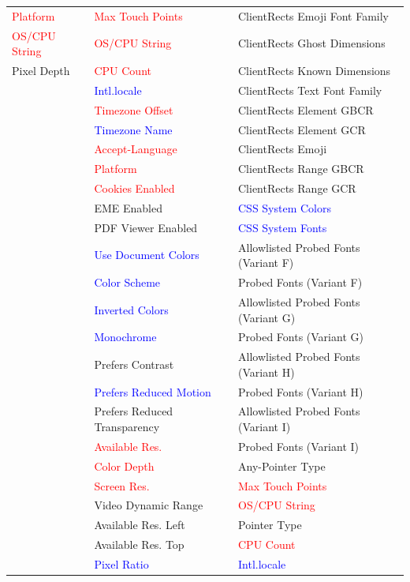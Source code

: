 {\begin{longtable}{l | l | l}
\textcolor{red}{Platform} & \textcolor{red}{Max Touch Points} & ClientRects Emoji Font Family \\
\textcolor{red}{OS/CPU String} & \textcolor{red}{OS/CPU String} & ClientRects Ghost Dimensions \\
Pixel Depth & \textcolor{red}{CPU Count} & ClientRects Known Dimensions \\
 & \textcolor{blue}{Intl.locale} & ClientRects Text Font Family \\
 & \textcolor{red}{Timezone Offset} & ClientRects Element GBCR \\
 & \textcolor{blue}{Timezone Name} & ClientRects Element GCR \\
 & \textcolor{red}{Accept-Language} & ClientRects Emoji \\
 & \textcolor{red}{Platform} & ClientRects Range GBCR \\
 & \textcolor{red}{Cookies Enabled} & ClientRects Range GCR \\
 & EME Enabled & \textcolor{blue}{CSS System Colors} \\
 & PDF Viewer Enabled & \textcolor{blue}{CSS System Fonts} \\
 & \textcolor{blue}{Use Document Colors} & Allowlisted Probed Fonts (Variant F) \\
 & \textcolor{blue}{Color Scheme} & Probed Fonts (Variant F) \\
 & \textcolor{blue}{Inverted Colors} & Allowlisted Probed Fonts (Variant G) \\
 & \textcolor{blue}{Monochrome} & Probed Fonts (Variant G) \\
 & Prefers Contrast & Allowlisted Probed Fonts (Variant H) \\
 & \textcolor{blue}{Prefers Reduced Motion} & Probed Fonts (Variant H) \\
 & Prefers Reduced Transparency & Allowlisted Probed Fonts (Variant I) \\
 & \textcolor{red}{Available Res.} & Probed Fonts (Variant I) \\
 & \textcolor{red}{Color Depth} & Any-Pointer Type \\
 & \textcolor{red}{Screen Res.} & \textcolor{red}{Max Touch Points} \\
 & Video Dynamic Range & \textcolor{red}{OS/CPU String} \\
 & Available Res. Left & Pointer Type \\
 & Available Res. Top & \textcolor{red}{CPU Count} \\
 & \textcolor{blue}{Pixel Ratio} & \textcolor{blue}{Intl.locale} \\

\end{longtable}}
